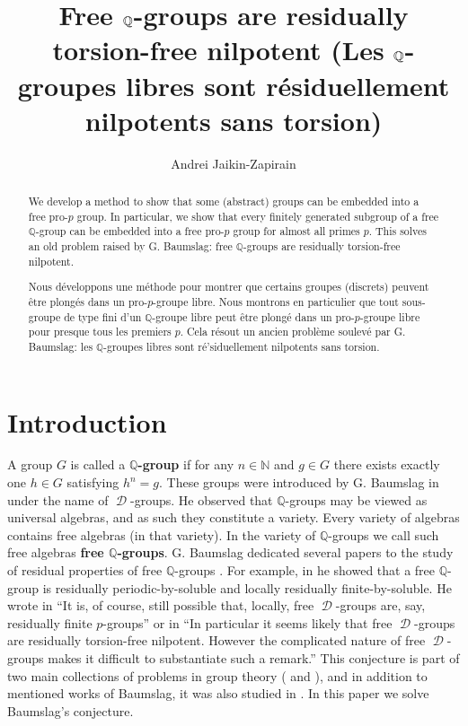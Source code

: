 \documentclass[11pt]{amsart}
\title[Free  $\Q$-groups are residually torsion-free nilpotent]
{Free  $\Q$-groups are residually torsion-free nilpotent 
(Les $\Q$-groupes libres sont r\'esiduellement nilpotents sans torsion)}
\author{Andrei Jaikin-Zapirain}
\numberwithin{claimcounter}{lem}
\DeclareMathOperator{\D}{\mathcal D}
\newcommand{\N}{\mathbb{N}}
\newcommand{\Q}{\mathbb{Q}}
\begin{document}
\begin{abstract}
We develop a method to show that some  (abstract) groups can be  embedded into a free pro-$p$ group. In particular,  we show that  every finitely generated subgroup  of   a free $\Q$-group can be embedded into a  free pro-$p$ group for almost all primes $p$. This solves an  old problem raised by G. Baumslag: free $\Q$-groups are residually torsion-free nilpotent.


Nous d\'eveloppons une m\'ethode pour montrer que certains groupes (discrets) peuvent \^etre plong\'es dans un pro-$p$-groupe libre. Nous montrons en particulier  que tout sous-groupe de type fini d'un $\Q$-groupe libre peut \^etre plong\'e dans un pro-$p$-groupe libre pour presque tous les premiers $p$. Cela r\'esout un ancien probl\`eme soulev\'e par G. Baumslag: les $\Q$-groupes libres sont  r\'e'siduellement nilpotents sans torsion.
\end{abstract}


  \maketitle

 \section{Introduction} 
 A  group $G$ is called a {\bf $\Q$-group } if for any $n\in \N$ and $ g\in G$  there exists exactly one $h\in G$ satisfying $h^n=g$. These groups were introduced by G. Baumslag in \cite{Ba60} under the name of $\D$-groups. He observed that $\Q$-groups may be viewed as universal algebras, and as such they constitute
a variety. Every variety of algebras contains free algebras (in that variety).
In the variety of  $\Q$-groups we  call  such free algebras {\bf free $\Q$-groups}.  G. Baumslag dedicated several papers to the study of residual properties of free $\Q$-groups \cite{Ba65, Ba68, Ba10}. For example, in \cite{Ba65} he showed that a free $\Q$-group is residually periodic-by-soluble and locally residually finite-by-soluble. He wrote in \cite{Ba65} ``It is, of course, still possible that, locally, free $\D$-groups are, say, residually
finite $p$-groups'' or in \cite{Ba68} ``In particular it seems likely that free $\D$-groups are residually torsion-free nilpotent. However the complicated nature of free $\D$-groups makes it difficult to
substantiate such a remark.'' This conjecture   is part of two main collections of problems in group theory (\cite[Problem F12]{BMS} and \cite[Problem 13.39 (a),(c)] {Kou}), and in addition to mentioned works of Baumslag, it was  also studied in  \cite{Ch68, GMRS97}.
 In this paper we solve Baumslag's conjecture.
 
\end{document}
